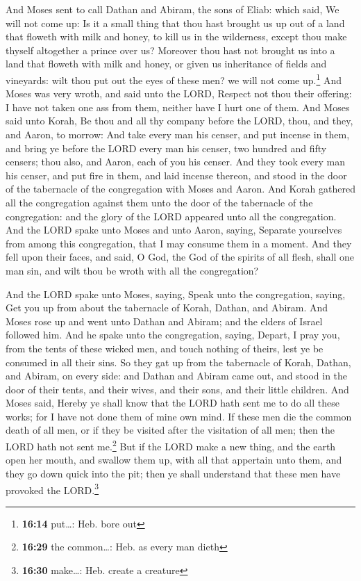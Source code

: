  And Moses sent to call Dathan and Abiram, the sons of
Eliab: which said, We will not come up:  Is it a small
thing that thou hast brought us up out of a land that floweth with milk
and honey, to kill us in the wilderness, except thou make thyself
altogether a prince over us?  Moreover thou hast not
brought us into a land that floweth with milk and honey, or given us
inheritance of fields and vineyards: wilt thou put out the eyes of these
men? we will not come up.\footnote{\textbf{16:14} put\ldots: Heb. bore
  out}  And Moses was very wroth, and said unto the LORD,
Respect not thou their offering: I have not taken one ass from them,
neither have I hurt one of them.  And Moses said unto
Korah, Be thou and all thy company before the LORD, thou, and they, and
Aaron, to morrow:  And take every man his censer, and put
incense in them, and bring ye before the LORD every man his censer, two
hundred and fifty censers; thou also, and Aaron, each of you his censer.
 And they took every man his censer, and put fire in
them, and laid incense thereon, and stood in the door of the tabernacle
of the congregation with Moses and Aaron.  And Korah
gathered all the congregation against them unto the door of the
tabernacle of the congregation: and the glory of the LORD appeared unto
all the congregation.  And the LORD spake unto Moses and
unto Aaron, saying,  Separate yourselves from among this
congregation, that I may consume them in a moment.  And
they fell upon their faces, and said, O God, the God of the spirits of
all flesh, shall one man sin, and wilt thou be wroth with all the
congregation?

 And the LORD spake unto Moses, saying, 
Speak unto the congregation, saying, Get you up from about the
tabernacle of Korah, Dathan, and Abiram.  And Moses rose
up and went unto Dathan and Abiram; and the elders of Israel followed
him.  And he spake unto the congregation, saying, Depart,
I pray you, from the tents of these wicked men, and touch nothing of
theirs, lest ye be consumed in all their sins.  So they
gat up from the tabernacle of Korah, Dathan, and Abiram, on every side:
and Dathan and Abiram came out, and stood in the door of their tents,
and their wives, and their sons, and their little children.
 And Moses said, Hereby ye shall know that the LORD hath
sent me to do all these works; for I have not done them of mine own
mind.  If these men die the common death of all men, or
if they be visited after the visitation of all men; then the LORD hath
not sent me.\footnote{\textbf{16:29} the common\ldots: Heb. as every man
  dieth}  But if the LORD make a new thing, and the earth
open her mouth, and swallow them up, with all that appertain unto them,
and they go down quick into the pit; then ye shall understand that these
men have provoked the LORD.\footnote{\textbf{16:30} make\ldots: Heb.
  create a creature}

